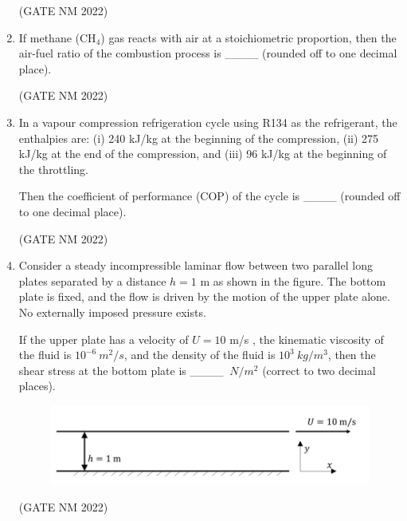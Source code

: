 \documentclass[journal,12pt,onecolumn]{IEEEtran}
\theoremstyle{remark}
\begin{document}
\begin{enumerate}
\hfill(GATE NM 2022)





\item
If methane (CH$_4$) gas reacts with air at a stoichiometric proportion, then the air-fuel ratio of the combustion process is  
\_\_\_\_ (rounded off to one decimal place).

\hfill(GATE NM 2022)





\item 
In a vapour compression refrigeration cycle using R134 as the refrigerant, the enthalpies are:  
(i) 240 kJ/kg at the beginning of the compression,  
(ii) 275 kJ/kg at the end of the compression, and  
(iii) 96 kJ/kg at the beginning of the throttling.  

Then the coefficient of performance (COP) of the cycle is \_\_\_\_  (rounded off to one decimal place).

\hfill(GATE NM 2022)







\item  
Consider a steady incompressible laminar flow between two parallel long plates separated by a distance  
$h = 1$ m  as shown in the figure.  
The bottom plate is fixed, and the flow is driven by the motion of the upper plate alone.  
No externally imposed pressure exists.  

If the upper plate has a velocity of $U = 10$ m/s , the kinematic viscosity of the fluid is  
$10^{-6}\ m^2/s$, and the density of the fluid is $10^3\ kg/m^3$,  
then the shear stress at the bottom plate is \_\_\_\_  $\ N/m^2  $ (correct to two decimal places).

\begin{figure}[h]
	\centering
	\includegraphics[width=0.5\columnwidth]{fig15}
	\caption{}
	\label{fig:placeholder}
\end{figure}

\hfill(GATE NM 2022)









\end{enumerate}
\end{document}
